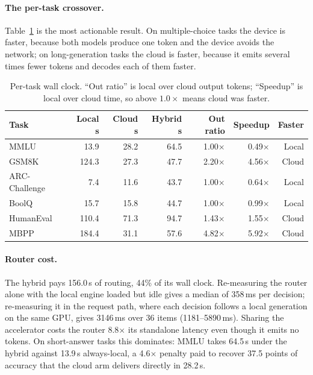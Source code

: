 \documentclass[11pt,a4paper]{article}
\begin{document}
\paragraph{The per-task crossover.}
Table~\ref{tab:crossover} is the most actionable result. On multiple-choice
tasks the device is faster, because both models produce one token and the device
avoids the network; on long-generation tasks the cloud is faster, because it
emits several times fewer tokens and decodes each of them faster.

\begin{table}[!htbp]
\centering
\small
\caption{Per-task wall clock. ``Out ratio'' is local over cloud output tokens;
``Speedup'' is local over cloud time, so above $1.0\times$ means cloud was faster.}
\label{tab:crossover}
\begin{tabular}{@{}lrrrrrr@{}}
\toprule
Task & Local s & Cloud s & Hybrid s & Out ratio & Speedup & Faster \\
\midrule
MMLU & 13.9 & 28.2 & 64.5 & 1.00$\times$ & 0.49$\times$ & Local \\
GSM8K & 124.3 & 27.3 & 47.7 & 2.20$\times$ & 4.56$\times$ & Cloud \\
ARC-Challenge & 7.4 & 11.6 & 43.7 & 1.00$\times$ & 0.64$\times$ & Local \\
BoolQ & 15.7 & 15.8 & 44.7 & 1.00$\times$ & 0.99$\times$ & Local \\
HumanEval & 110.4 & 71.3 & 94.7 & 1.43$\times$ & 1.55$\times$ & Cloud \\
MBPP & 184.4 & 31.1 & 57.6 & 4.82$\times$ & 5.92$\times$ & Cloud \\
\bottomrule
\end{tabular}
\end{table}

\paragraph{Router cost.}
The hybrid pays 156.0\,s of routing, 44\% of its wall clock.
Re-measuring the router alone with the local engine loaded but idle gives a
median of 358\,ms per decision; re-measuring it in the request
path, where each decision follows a local generation on the same GPU, gives
3146\,ms over 36 items
(1181--5890\,ms). Sharing the accelerator costs the router
8.8$\times$ its standalone latency even though it emits no
tokens. On short-answer tasks this dominates: MMLU takes 64.5\,s under the
hybrid against 13.9\,s always-local, a 4.6$\times$ penalty paid to recover
37.5 points of accuracy that the cloud arm delivers directly in 28.2\,s.
\end{document}
